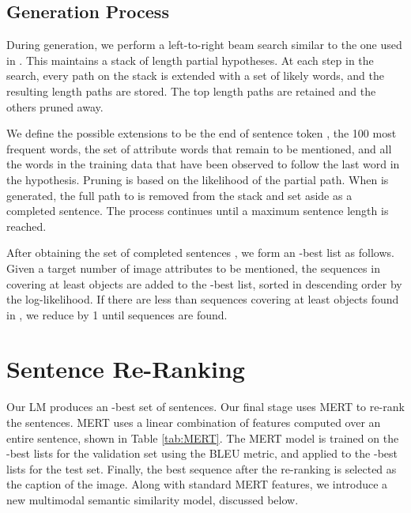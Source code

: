 \documentclass[10pt,twocolumn,letterpaper]{article}
\begin{document}
\subsection{Generation Process}

During generation, we perform a left-to-right beam search similar to the one used in \cite{Ratnaparkhi2000}. This maintains a stack of length  partial hypotheses. At each step in the search, every path on the stack is extended with a set of likely words, and the resulting length  paths are stored. The top  length  paths are retained and the others pruned away.

We define the possible extensions to be the end of sentence token , the 100 most frequent words, the set of attribute words that remain to be mentioned, and all the words in the training data that have been observed to follow the last word in the hypothesis.  Pruning is based on the likelihood of the partial path. When  is generated, the full path to  is removed from the stack and set aside as a completed sentence. The process continues until a maximum sentence length  is reached.

After obtaining the set of completed sentences , we form an -best list as follows. Given a target number of  image attributes to be mentioned, the sequences in  covering at least  objects are added to the -best list, sorted in descending order by the log-likelihood. If there are less than  sequences covering at least  objects found in , we reduce  by 1 until  sequences are found.

\section{Sentence Re-Ranking}\label{sec:rerank}

Our LM produces an -best set of sentences. Our final stage uses MERT \cite{Och2003} to re-rank the  sentences. MERT uses a linear combination of features computed over an entire sentence, shown in Table \ref{tab:MERT}. The MERT model is trained on the -best lists for the validation set using the BLEU metric, and applied to the -best lists for the test set. Finally, the best sequence after the re-ranking is selected as the caption of the image.  Along with standard MERT features, we introduce a new multimodal semantic similarity model, discussed below.  
\end{document}
